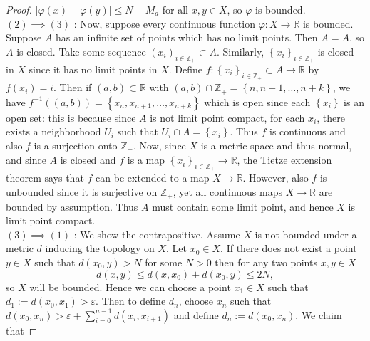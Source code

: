 \documentclass[reqno]{amsart}
\theoremstyle{plain}%
\theoremstyle{definition}
\theoremstyle{remark}
\begin{document}
\begin{proof}
    $\left| \varphi(x) - \varphi(y) \right| \le N - M_d$ for all
    $x,y \in X$, so $\varphi$ is bounded.\\
    \linebreak
    $(2) \implies (3)$ : Now, suppose every continuous function $\varphi  \colon
    X \to \mathbb{R}$
     is bounded.
     Suppose $A$ has an infinite set of points which has no limit points.
     Then $\overline{A} = A$, so $A$ is closed.
     Take some sequence $\left( x_i \right)_{i \in \mathbb{Z}_+}
     \subset A$. Similarly, $\left\{ x_i \right\}_{i \in \mathbb{Z}_+}$ is
     closed in $X$
     since it has no limit points in $X$. Define
     $f  \colon \left\{ x_i \right\}_{i \in \mathbb{Z}_+}\subset A \to \mathbb{R}$ by
     $f(x_i) = i$. Then
     if $\left( a,b \right) \subset \mathbb{R}$ with
     $\left( a,b \right) \cap \mathbb{Z}_+ = \left\{ 
     n, n+1, \ldots, n+k\right\} $, we have
     $f^{-1}\left( (a,b) \right) =
     \left\{ x_n, x_{n+1},\ldots, x_{n+k} \right\} $ which is open since
     each $\left\{ x_i \right\} $ is an open set: this is because since
     $A$ is not limit point compact, for each $x_i$, there exists
     a neighborhood $U_i$ such that $U_i \cap A = \left\{ x_i \right\} $.
     Thus $f$ is continuous and also $f$ is a surjection onto
     $\mathbb{Z}_+$.
     Now, since $X$ is a metric space and thus normal, and since
     $A$ is closed and $f$ is a map $\left\{ x_i \right\}_{i \in \mathbb{Z}_+}
     \to \mathbb{R}$, the Tietze extension
     theorem says that $f$ can be extended to a map
     $X \to \mathbb{R}$. However, also $f$ is unbounded since it
     is surjective on $\mathbb{Z}_+$, yet all continuous maps
     $X \to \mathbb{R}$ are bounded by assumption. Thus $A$ must contain
     some limit point, and hence $X$ is limit point compact.\\
     \linebreak
     $\left( 3 \right) \implies (1)$ : We show the contrapositive.
     Assume $X$ is not bounded under a metric $d$ inducing the topology on
     $X$.
     Let $x_0 \in X$. If
     there does not exist a point $y \in X$ such that
     $d(x_0,y) > N$ for some $N >0$ then for any two points
     $x,y \in X$ 
     \[
     d(x,y) \le d(x,x_0) + d(x_0,y) \le 2N,
     \] 
     so $X$ will be bounded. Hence we can
     choose a point $x_1 \in X$ such that
     $d_1 := d(x_0, x_1) > \varepsilon$. Then
      to define $d_n$, choose $x_n$ such that
      $d(x_0, x_n) > \varepsilon +  \sum_{i=0}^{n-1} d\left( x_i, x_{i+1} \right) $ and define
      $d_n := d\left( x_0, x_n \right) $. We claim that

\end{proof}
\end{document}
